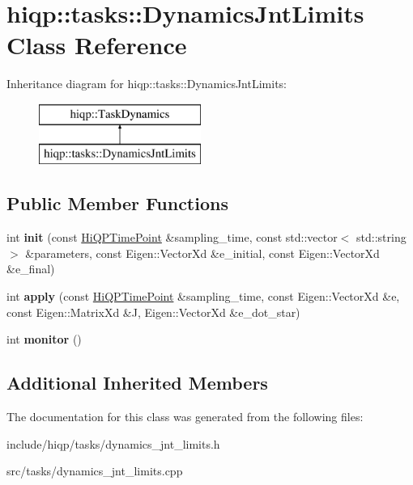 \hypertarget{classhiqp_1_1tasks_1_1DynamicsJntLimits}{\section{hiqp\-:\-:tasks\-:\-:Dynamics\-Jnt\-Limits Class Reference}
\label{classhiqp_1_1tasks_1_1DynamicsJntLimits}
}
Inheritance diagram for hiqp\-:\-:tasks\-:\-:Dynamics\-Jnt\-Limits\-:\begin{figure}[H]
\begin{center}
\leavevmode
\includegraphics[height=2.000000cm]{classhiqp_1_1tasks_1_1DynamicsJntLimits}
\end{center}
\end{figure}
\subsection*{Public Member Functions}
\begin{DoxyCompactItemize}
\item 
\hypertarget{classhiqp_1_1tasks_1_1DynamicsJntLimits_a27a2ef03ce289d01929a0ce581a43d79}{int {\bfseries init} (const \hyperlink{classhiqp_1_1HiQPTimePoint}{Hi\-Q\-P\-Time\-Point} \&sampling\-\_\-time, const std\-::vector$<$ std\-::string $>$ \&parameters, const Eigen\-::\-Vector\-Xd \&e\-\_\-initial, const Eigen\-::\-Vector\-Xd \&e\-\_\-final)}\label{classhiqp_1_1tasks_1_1DynamicsJntLimits_a27a2ef03ce289d01929a0ce581a43d79}

\item 
\hypertarget{classhiqp_1_1tasks_1_1DynamicsJntLimits_a95aca24c1697eb748c359811f353d2c2}{int {\bfseries apply} (const \hyperlink{classhiqp_1_1HiQPTimePoint}{Hi\-Q\-P\-Time\-Point} \&sampling\-\_\-time, const Eigen\-::\-Vector\-Xd \&e, const Eigen\-::\-Matrix\-Xd \&J, Eigen\-::\-Vector\-Xd \&e\-\_\-dot\-\_\-star)}\label{classhiqp_1_1tasks_1_1DynamicsJntLimits_a95aca24c1697eb748c359811f353d2c2}

\item 
\hypertarget{classhiqp_1_1tasks_1_1DynamicsJntLimits_a2fb4ce97cfefff5c1d67e25ca7e39976}{int {\bfseries monitor} ()}\label{classhiqp_1_1tasks_1_1DynamicsJntLimits_a2fb4ce97cfefff5c1d67e25ca7e39976}

\end{DoxyCompactItemize}
\subsection*{Additional Inherited Members}


The documentation for this class was generated from the following files\-:\begin{DoxyCompactItemize}
\item 
include/hiqp/tasks/dynamics\-\_\-jnt\-\_\-limits.\-h\item 
src/tasks/dynamics\-\_\-jnt\-\_\-limits.\-cpp\end{DoxyCompactItemize}
